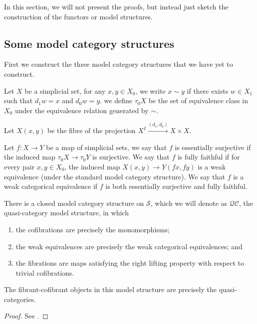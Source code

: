 \begin{refsection}
In this section, we will not present the proofs, but instead just sketch the construction of the functors or model structures.

\subsection{Some model category structures}
First we construct the three model category structures that we have yet to construct.

\begin{defin}
Let $X$ be a simplicial set, for any $x,y\in X_0$, we write $x\sim y$ if there exists $w\in X_1$ such that $d_1w=x$ and $d_0w=y$. we define $\tau_0X$ be the set of equivalence class in $X_0$ under the equivalence relation generated by $\sim$.

Let $X(x,y)$ be the fibre of the projection $X^I\xrightarrow{(d_1,d_0)} X\times X$.

Let $f:X\to Y$ be a map of simplicial sets, we say that $f$ is essentially surjective if the induced map $\tau_0X\to\tau_0Y$ is surjective. We say that $f$ is fully faithful if for every pair $x,y\in X_0$, the induced map $X(x,y)\to Y(fx,fy)$ is a weak equivalence (under the standard model category structure). We say that $f$ is a weak categorical equivalence if $f$ is both essentially surjective and fully faithful.
\end{defin}
\begin{thm}
There is a closed model category structure on $\mathcal S$, which we will denote as $\mathcal{QC}$, the quasi-category model structure, in which
\begin{enumerate}
\item the cofibrations are precisely the monomorphisms;
\item the weak equivalences are precisely the weak categorical equivalences; and
\item the fibrations are maps satisfying the right lifting property with respect to trivial cofibrations.
\end{enumerate}
The fibrant-cofibrant objects in this model structure are precisely the quasi-categories.
\end{thm}

\begin{proof}
See \cite{joyal2}.
\end{proof}


\end{refsection}
